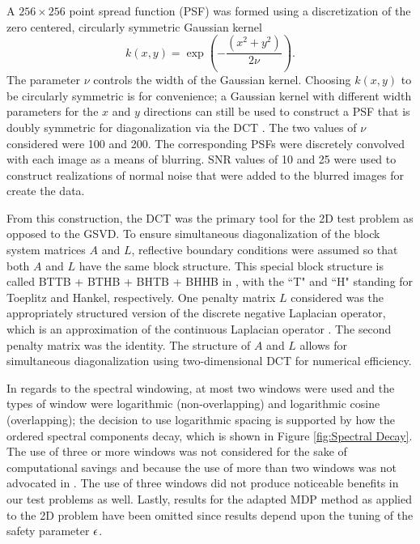 \documentclass[12pt]{article}
\begin{document}
A $256 \times 256$ point spread function (PSF) was formed using a discretization of the zero centered, circularly symmetric Gaussian kernel
\[k(x,y) = \exp\left(-\frac{(x^2 + y^2)}{2\nu}\right).\]
The parameter $\nu$ controls the width of the Gaussian kernel. Choosing $k(x,y)$ to be circularly symmetric is for convenience; a Gaussian kernel with different width parameters for the $x$ and $y$ directions can still be used to construct a PSF that is doubly symmetric for diagonalization via the DCT \cite{HansenNagyOLeary}. The two values of $\nu$ considered were 100 and 200. The corresponding PSFs were discretely convolved with each image as a means of blurring. SNR values of 10 and 25 were used to construct realizations of normal noise that were added to the blurred images for create the data. \par 
From this construction, the DCT was the primary tool for the 2D test problem as opposed to the GSVD. To ensure simultaneous diagonalization of the block system matrices $A$ and $L$, reflective boundary conditions were assumed so that both $A$ and $L$ have the same block structure. This special block structure is called BTTB + BTHB + BHTB + BHHB in \cite{HansenNagyOLeary}, with the ``T" and ``H" standing for Toeplitz and Hankel, respectively. One penalty matrix $L$ considered was the appropriately structured version of the discrete negative Laplacian operator, which is an approximation of the continuous Laplacian operator \cite{DebnathMikusinski2005,LeVeque2007}. The second penalty matrix was the identity. The structure of $A$ and $L$ allows for simultaneous diagonalization using two-dimensional DCT for numerical efficiency. \par
In regards to the spectral windowing, at most two windows were used and the types of window were logarithmic (non-overlapping) and logarithmic cosine (overlapping); the decision to use logarithmic spacing is supported by how the ordered spectral components decay, which is shown in Figure \ref{fig:Spectral Decay}. The use of three or more windows was not considered for the sake of computational savings and because the use of more than two windows was not advocated in \cite{ChungEasleyOLeary}. The use of three windows did not produce noticeable benefits in our test problems as well. Lastly, results for the adapted MDP method as applied to the 2D problem have been omitted since results depend upon the tuning of the safety parameter $\epsilon$.
\end{document}
